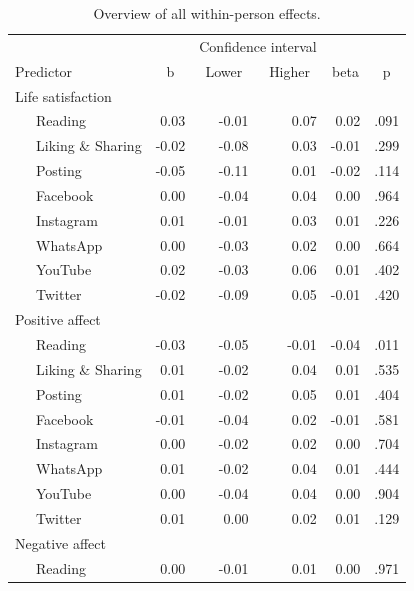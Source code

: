 \documentclass[
  man,mask,floatsintext]{apa7}
\begin{document}
\begin{table}[tbp]

\begin{center}
\begin{threeparttable}

\caption{\label{tab:tab-within}Overview of all within-person effects.}

\footnotesize{

\begin{tabular}{lrrrrr}
\toprule
 &  & \multicolumn{2}{c}{Confidence interval}  &  &\\
\cmidrule(r){3-4}
Predictor & \multicolumn{1}{c}{b} & \multicolumn{1}{c}{Lower} & \multicolumn{1}{c}{Higher} & \multicolumn{1}{c}{beta} & \multicolumn{1}{c}{p}\\
\midrule
Life satisfaction &  &  &  &  & \\
\ \ \ Reading & 0.03 & -0.01 & 0.07 & 0.02 & .091\\
\ \ \ Liking \& Sharing & -0.02 & -0.08 & 0.03 & -0.01 & .299\\
\ \ \ Posting & -0.05 & -0.11 & 0.01 & -0.02 & .114\\
\ \ \ Facebook & 0.00 & -0.04 & 0.04 & 0.00 & .964\\
\ \ \ Instagram & 0.01 & -0.01 & 0.03 & 0.01 & .226\\
\ \ \ WhatsApp & 0.00 & -0.03 & 0.02 & 0.00 & .664\\
\ \ \ YouTube & 0.02 & -0.03 & 0.06 & 0.01 & .402\\
\ \ \ Twitter & -0.02 & -0.09 & 0.05 & -0.01 & .420\\
Positive affect &  &  &  &  & \\
\ \ \ Reading & -0.03 & -0.05 & -0.01 & -0.04 & .011\\
\ \ \ Liking \& Sharing & 0.01 & -0.02 & 0.04 & 0.01 & .535\\
\ \ \ Posting & 0.01 & -0.02 & 0.05 & 0.01 & .404\\
\ \ \ Facebook & -0.01 & -0.04 & 0.02 & -0.01 & .581\\
\ \ \ Instagram & 0.00 & -0.02 & 0.02 & 0.00 & .704\\
\ \ \ WhatsApp & 0.01 & -0.02 & 0.04 & 0.01 & .444\\
\ \ \ YouTube & 0.00 & -0.04 & 0.04 & 0.00 & .904\\
\ \ \ Twitter & 0.01 & 0.00 & 0.02 & 0.01 & .129\\
Negative affect &  &  &  &  & \\
\ \ \ Reading & 0.00 & -0.01 & 0.01 & 0.00 & .971\\

\end{tabular}}
\end{threeparttable}
\end{center}
\end{table}
\end{document}
